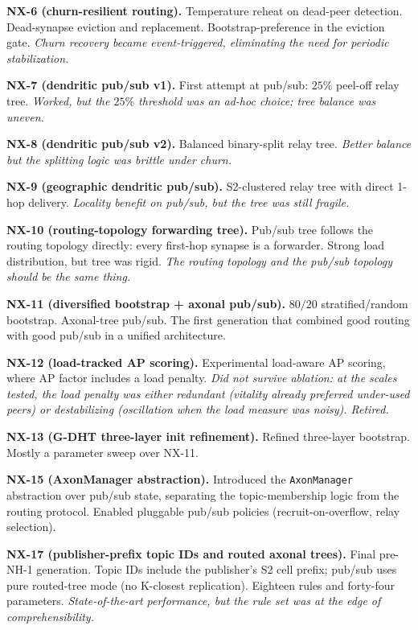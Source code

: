 \documentclass[twoside,nobib]{tufte-book}
\begin{document}
\textbf{NX-6 (churn-resilient routing).} Temperature reheat on
dead-peer detection. Dead-synapse eviction and replacement.
Bootstrap-preference in the eviction gate. \emph{Churn recovery
became event-triggered, eliminating the need for periodic
stabilization.}

\textbf{NX-7 (dendritic pub/sub v1).} First attempt at pub/sub:
$25\%$ peel-off relay tree. \emph{Worked, but the $25\%$
threshold was an ad-hoc choice; tree balance was uneven.}

\textbf{NX-8 (dendritic pub/sub v2).} Balanced binary-split
relay tree. \emph{Better balance but the splitting logic was
brittle under churn.}

\textbf{NX-9 (geographic dendritic pub/sub).} S2-clustered relay
tree with direct 1-hop delivery. \emph{Locality benefit on pub/sub,
but the tree was still fragile.}

\textbf{NX-10 (routing-topology forwarding tree).} Pub/sub tree
follows the routing topology directly: every first-hop synapse
is a forwarder. Strong load distribution, but tree was rigid.
\emph{The routing topology and the pub/sub topology should be
the same thing.}

\textbf{NX-11 (diversified bootstrap + axonal pub/sub).}
$80/20$ stratified/random bootstrap. Axonal-tree pub/sub. The
first generation that combined good routing with good pub/sub
in a unified architecture.

\textbf{NX-12 (load-tracked AP scoring).} Experimental
load-aware AP scoring, where AP factor includes a load
penalty. \emph{Did not survive ablation: at the scales tested,
the load penalty was either redundant (vitality already
preferred under-used peers) or destabilizing (oscillation when
the load measure was noisy). Retired.}

\textbf{NX-13 (G-DHT three-layer init refinement).} Refined
three-layer bootstrap. Mostly a parameter sweep over NX-11.

\textbf{NX-15 (AxonManager abstraction).} Introduced the
\texttt{AxonManager} abstraction over pub/sub state, separating
the topic-membership logic from the routing protocol. Enabled
pluggable pub/sub policies (recruit-on-overflow, relay
selection).

\textbf{NX-17 (publisher-prefix topic IDs and routed axonal
trees).} Final pre-NH-1 generation. Topic IDs include the
publisher's S2 cell prefix; pub/sub uses pure routed-tree mode
(no K-closest replication). Eighteen rules and forty-four
parameters. \emph{State-of-the-art performance, but the rule
set was at the edge of comprehensibility.}
\end{document}
